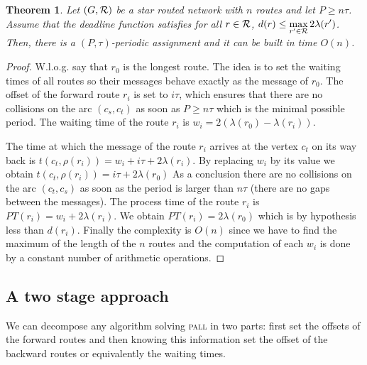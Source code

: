 \documentclass[10pt, conference, letterpaper]{IEEEtran}
\newtheorem{theorem}{Theorem}
\newcommand\pall{\textsc{pall}\xspace}
\begin{document}
	 \begin{theorem}\label{th:asym}
	 Let $(G,{\cal R})$ be a star routed network with $n$ routes and let $P \geq n\tau$. Assume that the deadline function 
	 satisfies for all $r\in {\cal R}$, $d(r) \leq \displaystyle{\max_{r' \in  {\cal R}} 2\lambda(r')}$. Then, there is a $(P,\tau)$-periodic assignment and it can be built in time $O(n)$.
	 \end{theorem}
      \begin{proof}
      W.l.o.g. say that $r_0$ is the longest route. The idea is to set the waiting times of all routes so their messages behave exactly as the message of $r_0$.        
        The offset of the forward route $r_i$ is set to $i\tau$, which ensures that there are no collisions on the arc $(c_s,c_t)$ as soon as $P \geq n\tau$ which is the minimal possible period. The waiting time of the route $r_i$ is $w_i = 2(\lambda(r_{0}) - \lambda(r_{i}))$.
        
        The time at which the message of the route $r_i$ arrives at the vertex $c_t$ on its way back is $t(c_t,\rho(r_i)) = w_i + i\tau + 2\lambda(r_{i})$. By replacing $w_i$ by its value we obtain $t(c_t,\rho(r_i)) =  i\tau + 2\lambda(r_{0})$
        As a conclusion there are no collisions on the arc $(c_t,c_s)$ as soon as the period is larger than $n\tau$ (there are no gaps between the messages). The process time of the route $r_i$ is $PT(r_i) = w_i + 2\lambda(r_{i}) $. We obtain $PT(r_i) = 2\lambda(r_{0})$ which is by hypothesis less than $d(r_i)$.
	Finally the complexity is $O(n)$ since we have to find the maximum of the length of the $n$ routes and the computation of each $w_i$ is done by a constant number of arithmetic operations.
     \end{proof}
     
    
     \subsection{A two stage approach}
     
     We can decompose any algorithm solving \pall in two parts: first set the offsets of the forward routes and then knowing this information set the offset of the backward routes or equivalently the waiting times.   
     
\end{document}
